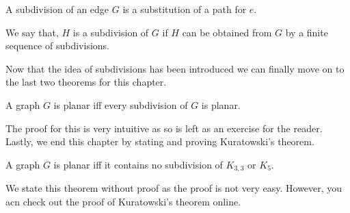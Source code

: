 \documentclass[../basic_graph_theory.tex]{subfiles}
\begin{document}
\begin{defn}
    A subdivision of an edge $G$ is a substitution of a path for $e$.
\end{defn}
\begin{defn}
    We say that, $H$ is a subdivision of $G$ if $H$ can be obtained from $G$ by a finite sequence of subdivisions.
\end{defn}

Now that the idea of subdivisions has been introduced we can finally move on to the last two theorems for this chapter.
\begin{thm}
    A graph $G$ is planar iff every subdivision of $G$ is planar.
\end{thm}
The proof for this is very intuitive as so is left as an exercise for the reader.\\
Lastly, we end this chapter by stating and proving Kuratowski's theorem.\\
\begin{thm}
    A graph $G$ is planar iff it contains no subdivision of $K_{3,3}$ or $K_{5}$.
\end{thm}
We state this theorem without proof as the proof is not very easy. However, you acn check out the proof of Kuratowski's theorem online.
\end{document}
